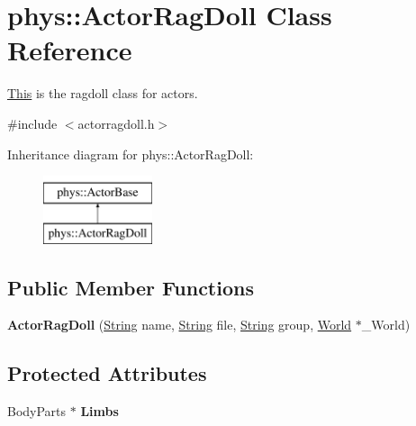 \hypertarget{classphys_1_1ActorRagDoll}{
\section{phys::ActorRagDoll Class Reference}
\label{d3/d0a/classphys_1_1ActorRagDoll}
}


\hyperlink{structThis}{This} is the ragdoll class for actors.  




{\ttfamily \#include $<$actorragdoll.h$>$}

Inheritance diagram for phys::ActorRagDoll:\begin{figure}[H]
\begin{center}
\leavevmode
\includegraphics[height=2cm]{d3/d0a/classphys_1_1ActorRagDoll}
\end{center}
\end{figure}
\subsection*{Public Member Functions}
\begin{DoxyCompactItemize}
\item 
\hypertarget{classphys_1_1ActorRagDoll_a24347ea317712f8d772a913789a4c199}{
{\bfseries ActorRagDoll} (\hyperlink{namespacephys_aa03900411993de7fbfec4789bc1d392e}{String} name, \hyperlink{namespacephys_aa03900411993de7fbfec4789bc1d392e}{String} file, \hyperlink{namespacephys_aa03900411993de7fbfec4789bc1d392e}{String} group, \hyperlink{classphys_1_1World}{World} $\ast$\_\-World)}
\label{d3/d0a/classphys_1_1ActorRagDoll_a24347ea317712f8d772a913789a4c199}

\end{DoxyCompactItemize}
\subsection*{Protected Attributes}
\begin{DoxyCompactItemize}
\item 
\hypertarget{classphys_1_1ActorRagDoll_af11bbe6ee9172490f52d812b4caa0138}{
BodyParts $\ast$ {\bfseries Limbs}}
\label{d3/d0a/classphys_1_1ActorRagDoll_af11bbe6ee9172490f52d812b4caa0138}

\end{DoxyCompactItemize}


